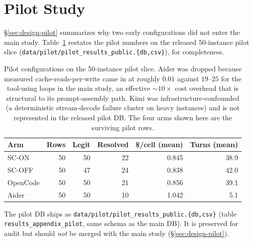 %

\appendix

\section{Pilot Study}
\label{app:pilot}

\S\ref{sec:design-pilot} summarizes why two early configurations did not enter the main
study. Table~\ref{tab:pilot} restates the pilot numbers on the released 50-instance pilot
slice (\texttt{data/pilot/pilot\_results\_public.\{db,csv\}}), for completeness.

\begin{table}[h]
  \centering
  \caption{Pilot configurations on the 50-instance pilot slice. Aider was dropped because
  measured cache-reads-per-write came in at roughly $0.01$ against $19$--$25$ for the
  tool-using loops in the main study, an effective ${\sim}10\times$ cost overhead that is
  structural to its prompt-assembly path. Kimi was infrastructure-confounded (a deterministic
  stream-decode failure cluster on heavy instances) and is not represented in the
  released pilot DB. The four arms shown here are the surviving pilot rows.}
  \label{tab:pilot}
  \begin{tabular}{lrrrrr}
    \toprule
    Arm       & Rows & Legit & Resolved & \$/cell (mean) & Turns (mean) \\
    \midrule
    SC-ON     & 50 & 50 & 22 & 0.845 & 38.9 \\
    SC-OFF    & 50 & 47 & 24 & 0.838 & 42.0 \\
    OpenCode  & 50 & 50 & 21 & 0.856 & 39.1 \\
    Aider     & 50 & 50 & 10 & 1.042 & \phantom{0}5.1 \\
    \bottomrule
  \end{tabular}
\end{table}

The pilot DB ships as \texttt{data/pilot/pilot\_results\_public.\{db,csv\}} (table
\texttt{results\_appendix\_pilot}, same schema as the main DB). It is preserved for
audit but should \emph{not} be merged with the main study (\S\ref{sec:design-pilot}).

